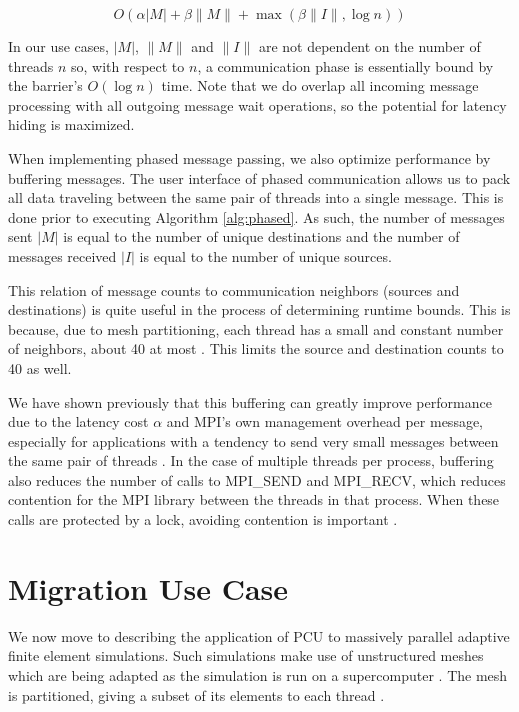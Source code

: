\documentclass[final,1p,times]{elsarticle}
\begin{document}
\[O(\alpha|M| + \beta\|M\| + \max(\beta\|I\|,\log n))\]

In our use cases, $|M|$, $\|M\|$ and $\|I\|$ are
not dependent on the number of threads $n$ so, with respect to $n$,
a communication phase is essentially bound by the barrier's $O(\log n)$ time.
Note that we do overlap all incoming message processing with all outgoing
message wait operations, so the potential for latency hiding is maximized.

When implementing phased message passing, we also optimize performance
by buffering messages.
The user interface of phased communication allows us to pack
all data traveling between the same pair of threads into a single message.
This is done prior to executing Algorithm \ref{alg:phased}.
As such, the number of messages sent $|M|$ is equal to the number of unique
destinations and the number of messages received $|I|$ is equal to the number
of unique sources.

This relation of message counts to communication neighbors (sources and
destinations) is quite useful in the process of determining runtime bounds.
This is because, due to mesh partitioning, each thread has a small
and constant number of neighbors,
about 40 at most \cite{zhou2010petascale}.
This limits the source and destination counts to 40 as well.

We have shown previously that this buffering can greatly improve performance
due to the latency cost $\alpha$ and MPI's own management overhead per message,
especially for applications
with a tendency to send very small messages between the same pair of threads
\cite{Ovcharenko2012140}.
In the case of multiple threads per process, buffering also reduces
the number of calls to MPI\_SEND and MPI\_RECV, which reduces
contention for the MPI library between the threads in that process.
When these calls are protected by a lock, avoiding contention is important
\cite{mavriplis2002parallel}.

\section{Migration Use Case}
\label{sec:migrate}

We now move to describing the application of PCU to massively parallel
adaptive finite element simulations.
Such simulations make use of unstructured meshes which are
being adapted as the simulation is run on a supercomputer 
\cite{Gal10,rasquin2014scalable,Zhou-flow}.
The mesh is partitioned, giving a subset of its elements to each thread 
\cite{rasquin2014scalable,zhou2012unstructured,Zhou-ewc}.
\end{document}
